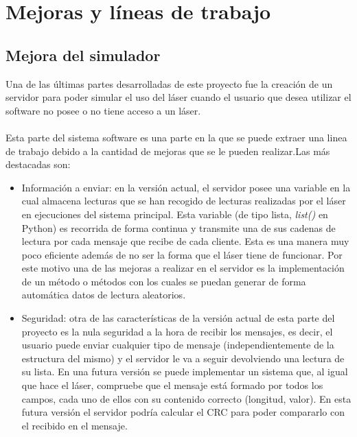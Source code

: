 \section{Mejoras y líneas de trabajo}

\subsection{Mejora del simulador}
Una de las últimas partes desarrolladas de este proyecto fue la creación de un servidor para poder simular el uso del láser cuando el usuario que desea utilizar el software no posee o no tiene acceso a un láser.\\
\\
Esta parte del sistema software es una parte en la que se puede extraer una linea de trabajo debido a la cantidad de mejoras que se le pueden realizar.Las más destacadas son:
\begin{itemize}
	\item Información a enviar: en la versión actual, el servidor posee una variable en la cual almacena lecturas que se han recogido de lecturas realizadas por el láser en ejecuciones del sistema principal. Esta variable (de tipo lista, \textit{list()} en Python) es recorrida de forma continua y transmite una de sus cadenas de lectura por cada mensaje que recibe de cada cliente. Esta es una manera muy poco eficiente además de no ser la forma que el láser tiene de funcionar. Por este motivo una de las mejoras a realizar en el servidor es la implementación de un método o métodos con los cuales se puedan generar de forma automática datos de lectura aleatorios.
	\item Seguridad: otra de las características de la versión actual de esta parte del proyecto es la nula seguridad a la hora de recibir los mensajes, es decir, el usuario puede enviar cualquier tipo de mensaje (independientemente de la estructura del mismo) y el servidor le va a seguir devolviendo una lectura de su lista. En una futura versión se puede implementar un sistema que, al igual que hace el láser, compruebe que el mensaje está formado por todos los campos, cada uno de ellos con su contenido correcto (longitud, valor). En esta futura versión el servidor podría calcular el CRC para poder compararlo con el recibido en el mensaje.
\end{itemize}

